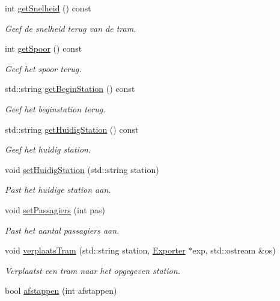 \begin{DoxyCompactItemize}
int \hyperlink{class_tram_aa8bcd980469801cb8524f170006f666c}{get\+Snelheid} () const
\begin{DoxyCompactList}\small\item\em Geef de snelheid terug van de tram. \end{DoxyCompactList}\item 
int \hyperlink{class_tram_a46c37aab218c334dac8b5340647f53ab}{get\+Spoor} () const
\begin{DoxyCompactList}\small\item\em Geef het spoor terug. \end{DoxyCompactList}\item 
std\+::string \hyperlink{class_tram_ae4a7cf6313452140ed54d219d1f6afba}{get\+Begin\+Station} () const
\begin{DoxyCompactList}\small\item\em Geef het beginstation terug. \end{DoxyCompactList}\item 
std\+::string \hyperlink{class_tram_ae1d03c1fb6e0f5f97c57d35fe10fa8dd}{get\+Huidig\+Station} () const
\begin{DoxyCompactList}\small\item\em Geef het huidig station. \end{DoxyCompactList}\item 
void \hyperlink{class_tram_ad8627700455e2d24563e08a72d887197}{set\+Huidig\+Station} (std\+::string station)
\begin{DoxyCompactList}\small\item\em Past het huidige station aan. \end{DoxyCompactList}\item 
void \hyperlink{class_tram_a3454b4b012930b02eff8fd22b7d9428a}{set\+Passagiers} (int pas)
\begin{DoxyCompactList}\small\item\em Past het aantal passagiers aan. \end{DoxyCompactList}\item 
void \hyperlink{class_tram_a8d55296c7ede4aa92c9b3a4b2a9495a8}{verplaats\+Tram} (std\+::string station, \hyperlink{class_exporter}{Exporter} $\ast$exp, std\+::ostream \&os)
\begin{DoxyCompactList}\small\item\em Verplaatst een tram naar het opgegeven station. \end{DoxyCompactList}\item 
bool \hyperlink{class_tram_a81186910caa5212b4a87eec84cd10a46}{afstappen} (int afstappen)

\end{DoxyCompactItemize}
